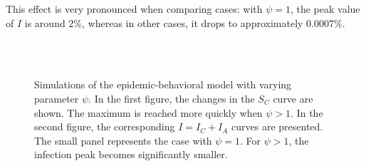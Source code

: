 This effect is very pronounced when comparing cases: with $\psi = 1$, the peak value of $I$ is around $2\%$, whereas in other cases, it drops to approximately $0.0007\%$.
\begin{figure}[ht]
	\centering
	 \\
	 \\
	\caption[Simulation varying $\psi$]{Simulations of the epidemic-behavioral model with varying parameter $\psi$. In the first figure, the changes in the $S_C$ curve are shown. The maximum is reached more quickly when $\psi > 1$. In the second figure, the corresponding $I = I_C + I_A$ curves are presented. The small panel represents the case with $\psi = 1$. For $\psi > 1$, the infection peak becomes significantly smaller.}
	\label{fig:sim_psi}
\end{figure}


